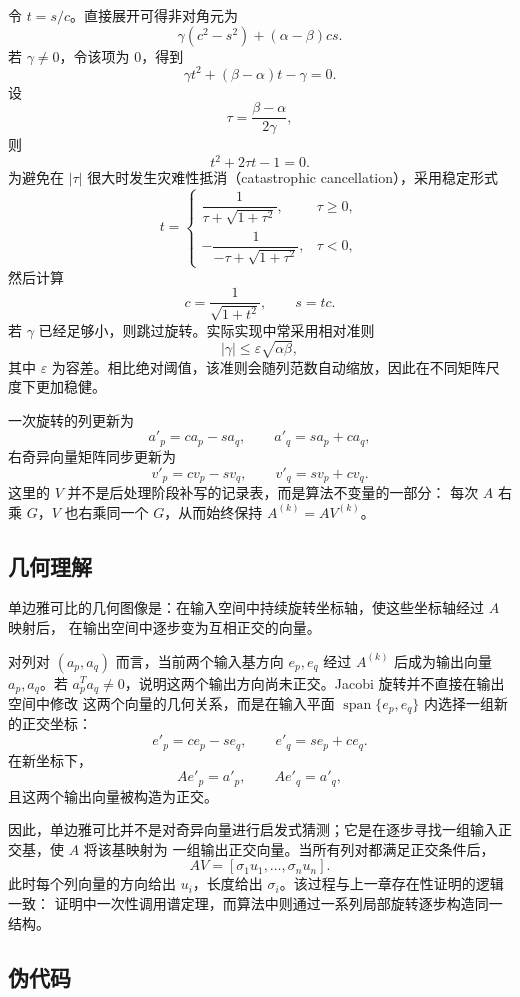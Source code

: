 令 $t=s/c$。直接展开可得非对角元为
\[
    \gamma(c^2-s^2)+(\alpha-\beta)cs.
\]
若 $\gamma\ne0$，令该项为 $0$，得到
\[
    \gamma t^2 +(\beta-\alpha)t-\gamma=0.
\]
设
\[
    \tau=\frac{\beta-\alpha}{2\gamma},
\]
则
\[
    t^2+2\tau t-1=0.
\]
为避免在 $|\tau|$ 很大时发生灾难性抵消（catastrophic cancellation），采用稳定形式
\[
    t =
    \begin{cases}
        \dfrac{1}{\tau+\sqrt{1+\tau^2}},   & \tau\ge0, \\[1.2em]
        -\dfrac{1}{-\tau+\sqrt{1+\tau^2}}, & \tau<0,
    \end{cases}
\]
然后计算
\[
    c=\frac{1}{\sqrt{1+t^2}},\qquad s=tc.
\]
若 $\gamma$ 已经足够小，则跳过旋转。实际实现中常采用相对准则
\[
    |\gamma|\le \varepsilon\sqrt{\alpha\beta},
\]
其中 $\varepsilon$ 为容差。相比绝对阈值，该准则会随列范数自动缩放，因此在不同矩阵尺度下更加稳健。

一次旋转的列更新为
\[
    a'_p = c a_p - s a_q,\qquad
    a'_q = s a_p + c a_q,
\]
右奇异向量矩阵同步更新为
\[
    v'_p = c v_p - s v_q,\qquad
    v'_q = s v_p + c v_q.
\]
这里的 $V$ 并不是后处理阶段补写的记录表，而是算法不变量的一部分：
每次 $A$ 右乘 $G$，$V$ 也右乘同一个 $G$，从而始终保持 $A^{(k)}=AV^{(k)}$。

\subsection{几何理解}

单边雅可比的几何图像是：在输入空间中持续旋转坐标轴，使这些坐标轴经过 $A$ 映射后，
在输出空间中逐步变为互相正交的向量。

对列对 $(a_p,a_q)$ 而言，当前两个输入基方向 $e_p,e_q$ 经过 $A^{(k)}$ 后成为输出向量
$a_p,a_q$。若 $a_p^Ta_q\ne0$，说明这两个输出方向尚未正交。Jacobi 旋转并不直接在输出空间中修改
这两个向量的几何关系，而是在输入平面 $\operatorname{span}\{e_p,e_q\}$ 内选择一组新的正交坐标：
\[
    e'_p = c e_p - s e_q,\qquad
    e'_q = s e_p + c e_q.
\]
在新坐标下，
\[
    A e'_p = a'_p,\qquad A e'_q = a'_q,
\]
且这两个输出向量被构造为正交。

因此，单边雅可比并不是对奇异向量进行启发式猜测；它是在逐步寻找一组输入正交基，使 $A$ 将该基映射为
一组输出正交向量。当所有列对都满足正交条件后，
\[
    A V = [\sigma_1u_1,\ldots,\sigma_nu_n].
\]
此时每个列向量的方向给出 $u_i$，长度给出 $\sigma_i$。该过程与上一章存在性证明的逻辑一致：
证明中一次性调用谱定理，而算法中则通过一系列局部旋转逐步构造同一结构。

\subsection{伪代码}

